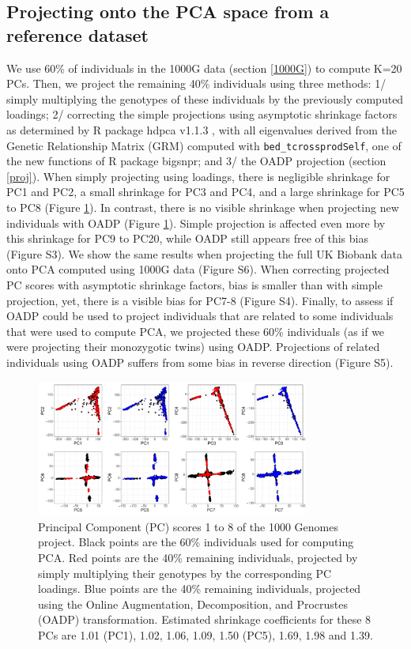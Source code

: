 \documentclass{bioinfo}
\begin{document}
\subsection{Projecting onto the PCA space from a reference dataset}

We use 60\% of individuals in the 1000G data (section \ref{1000G}) to compute K=20 PCs. Then, we project the remaining 40\% individuals using three methods: 1/ simply multiplying the genotypes of these individuals by the previously computed loadings; 2/ correcting the simple projections using asymptotic shrinkage factors as determined by R package hdpca v1.1.3 \cite[]{dey2019asymptotic}, with all eigenvalues derived from the Genetic Relationship Matrix (GRM) computed with \texttt{bed\_tcrossprodSelf}, one of the new functions of R package bigsnpr; and 3/ the OADP projection (section \ref{proj}). 
When simply projecting using loadings, there is negligible shrinkage for PC1 and PC2, a small shrinkage for PC3 and PC4, and a large shrinkage for PC5 to PC8 (Figure \ref{fig:proj1000G}).
In contrast, there is no visible shrinkage when projecting new individuals with OADP (Figure \ref{fig:proj1000G}).
Simple projection is affected even more by this shrinkage for PC9 to PC20, while OADP still appears free of this bias (Figure S3).
We show the same results when projecting the full UK Biobank data onto PCA computed using 1000G data  (Figure S6).
When correcting projected PC scores with asymptotic shrinkage factors, bias is smaller than with simple projection, yet, there is a visible bias for PC7-8 (Figure S4).
Finally, to assess if OADP could be used to project individuals that are related to some individuals that were used to compute PCA, we projected these 60\% individuals (as if we were projecting their monozygotic twins) using OADP. Projections of related individuals using OADP suffers from some bias in reverse direction (Figure S5).
\label{proj-related}

\begin{figure}[htb]
\centerline{\includegraphics[width=0.8\textwidth]{proj1000G-PC1-8.pdf}}
\caption{Principal Component (PC) scores 1 to 8 of the 1000 Genomes project.
Black points are the 60\% individuals used for computing PCA.
Red points are the 40\% remaining individuals, projected by simply multiplying their genotypes by the corresponding PC loadings.
Blue points are the 40\% remaining individuals, projected using the Online Augmentation, Decomposition, and Procrustes (OADP) transformation.
Estimated shrinkage coefficients for these 8 PCs are 1.01 (PC1), 1.02, 1.06, 1.09, 1.50 (PC5), 1.69, 1.98 and 1.39.
\label{fig:proj1000G}}
\end{figure}
\end{document}
